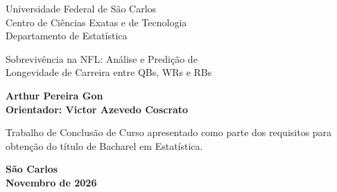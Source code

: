 

\clearpage{\thispagestyle{empty}\origcleardoublepage}
\thispagestyle{empty}
\begin{center}
{\large \sc Universidade Federal de São Carlos \\
Centro de Ciências Exatas e de Tecnologia \\
Departamento de Estatística} \\
\end{center}

\vspace*{2cm}

\begin{center}
{\Large Sobrevivência na NFL: Análise e Predição de \\
Longevidade de Carreira entre QBs, WRs e RBs}
\end{center}
\vspace{2.5cm}

\begin{center}
{\bf {\large Arthur Pereira Gon} \\ 
Orientador: Victor Azevedo Coscrato}
\end{center}
\vspace*{3cm}

\begin{flushright}
\begin{minipage}{0.55\textwidth}
Trabalho de Conclusão de Curso apresentado como parte dos requisitos para obtenção do título de Bacharel em Estatística.\\ 
\end{minipage}
\end{flushright}
\vspace{2cm}

\begin{center} 
{\bf São Carlos\\
Novembro de 2026}
\end{center}

